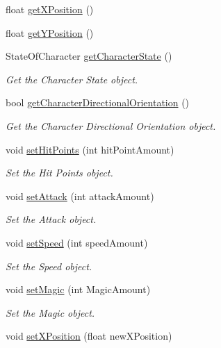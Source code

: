 \begin{DoxyCompactItemize}
float \mbox{\hyperlink{classCharacterStats_afb86511575622311cfe30efeff513e6f}{get\+X\+Position}} ()
\item 
float \mbox{\hyperlink{classCharacterStats_ac8669b2ea74ea7a712463f9f2e0d05c8}{get\+Y\+Position}} ()
\item 
State\+Of\+Character \mbox{\hyperlink{classCharacterStats_aaae019fd87e05cc2f98b440a868dcf41}{get\+Character\+State}} ()
\begin{DoxyCompactList}\small\item\em Get the Character State object. \end{DoxyCompactList}\item 
bool \mbox{\hyperlink{classCharacterStats_ad5fedea8c417b2ddcb6b72c8ce6a06ac}{get\+Character\+Directional\+Orientation}} ()
\begin{DoxyCompactList}\small\item\em Get the Character Directional Orientation object. \end{DoxyCompactList}\item 
void \mbox{\hyperlink{classCharacterStats_a7359c58479aebab283da03a0503cedf0}{set\+Hit\+Points}} (int hit\+Point\+Amount)
\begin{DoxyCompactList}\small\item\em Set the Hit Points object. \end{DoxyCompactList}\item 
void \mbox{\hyperlink{classCharacterStats_a67bfa42fdaecd66ad03786a44e45874c}{set\+Attack}} (int attack\+Amount)
\begin{DoxyCompactList}\small\item\em Set the Attack object. \end{DoxyCompactList}\item 
void \mbox{\hyperlink{classCharacterStats_a12f04dfcc06dae1bc1b0ae03babd28b6}{set\+Speed}} (int speed\+Amount)
\begin{DoxyCompactList}\small\item\em Set the Speed object. \end{DoxyCompactList}\item 
void \mbox{\hyperlink{classCharacterStats_a196481abbfd88753d5e6a55662ea086f}{set\+Magic}} (int Magic\+Amount)
\begin{DoxyCompactList}\small\item\em Set the Magic object. \end{DoxyCompactList}\item 
void \mbox{\hyperlink{classCharacterStats_a46c3cc5fce4e17bccb2a3b690f3ac7aa}{set\+X\+Position}} (float new\+X\+Position)

\end{DoxyCompactItemize}

